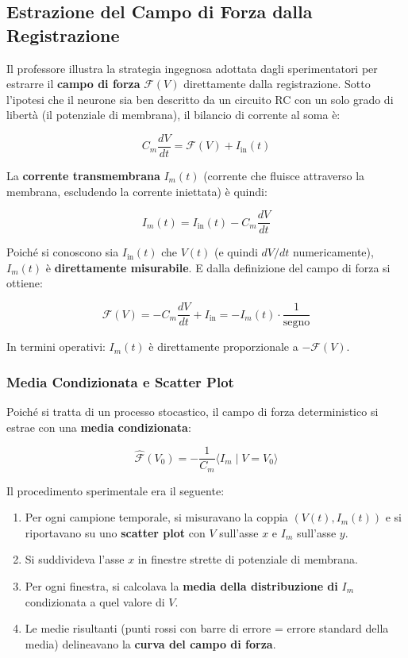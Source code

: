 \subsection{Estrazione del Campo di Forza dalla Registrazione}

Il professore illustra la strategia ingegnosa adottata dagli sperimentatori per estrarre il \textbf{campo di forza} $\mathcal{F}(V)$ direttamente dalla registrazione. Sotto l'ipotesi che il neurone sia ben descritto da un circuito RC con un solo grado di libertà (il potenziale di membrana), il bilancio di corrente al soma è:

\begin{equation}
C_m \frac{dV}{dt} = \mathcal{F}(V) + I_{\text{in}}(t)
\end{equation}

La \textbf{corrente transmembrana} $I_m(t)$ (corrente che fluisce attraverso la membrana, escludendo la corrente iniettata) è quindi:

\begin{equation}
I_m(t) = I_{\text{in}}(t) - C_m \frac{dV}{dt}
\end{equation}

Poiché si conoscono sia $I_{\text{in}}(t)$ che $V(t)$ (e quindi $dV/dt$ numericamente), $I_m(t)$ è \textbf{direttamente misurabile}. E dalla definizione del campo di forza si ottiene:

\begin{equation}
\mathcal{F}(V) = -C_m \frac{dV}{dt} + I_{\text{in}} = -I_m(t) \cdot \frac{1}{\text{segno}}
\end{equation}

In termini operativi: $I_m(t)$ è direttamente proporzionale a $-\mathcal{F}(V)$.

\subsubsection{Media Condizionata e Scatter Plot}

Poiché si tratta di un processo stocastico, il campo di forza deterministico si estrae con una \textbf{media condizionata}:

\begin{equation}
\hat{\mathcal{F}}(V_0) = -\frac{1}{C_m} \langle I_m \mid V = V_0 \rangle
\end{equation}

Il procedimento sperimentale era il seguente:

\begin{enumerate}
    \item Per ogni campione temporale, si misuravano la coppia $(V(t), I_m(t))$ e si riportavano su uno \textbf{scatter plot} con $V$ sull'asse $x$ e $I_m$ sull'asse $y$.
    \item Si suddivideva l'asse $x$ in finestre strette di potenziale di membrana.
    \item Per ogni finestra, si calcolava la \textbf{media della distribuzione di} $I_m$ condizionata a quel valore di $V$.
    \item Le medie risultanti (punti rossi con barre di errore = errore standard della media) delineavano la \textbf{curva del campo di forza}.
\end{enumerate}

